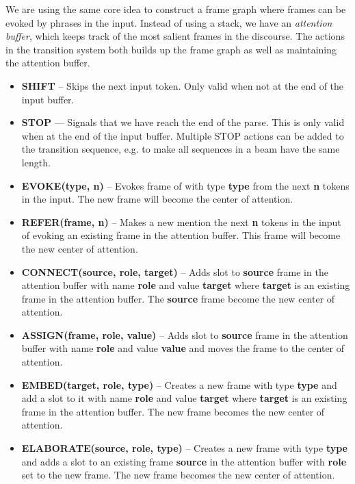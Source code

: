 \documentclass[11pt,a4paper]{article}
\begin{document}
We are using the same core idea to construct a frame graph where frames can be
evoked by phrases in the input. Instead of using a stack, we have an
\emph{attention buffer}, which keeps track of the most salient frames in the
discourse. The actions in the transition system both builds up the frame graph
as well as maintaining the attention buffer.

\begin{itemize}
  \item {\bf SHIFT} -- Skips the next input token. Only valid when not at the
        end of the input buffer.

  \item {\bf STOP} --- Signals that we have reach the end of the parse. This is
        only valid when at the end of the input buffer. Multiple STOP actions
        can be added to the transition sequence, e.g. to make all sequences in a
        beam have the same length.

  \item {\bf EVOKE(type, n)} -- Evokes frame of with type {\bf type} from
        the next {\bf n} tokens in the input. The new frame will become the
        center of attention.

  \item {\bf REFER(frame, n)} -- Makes a new mention the next {\bf n} tokens in
        the input of evoking an existing frame in the attention buffer. This
        frame will become the new center of attention.

  \item {\bf CONNECT(source, role, target)} -- Adds slot to {\bf source} frame
        in the attention buffer with name {\bf role} and value {\bf target}
        where {\bf target} is an existing frame in the attention buffer. The
        {\bf source} frame become the new center of attention.

  \item {\bf ASSIGN(frame, role, value)} -- Adds slot to {\bf source} frame in
        the attention buffer  with name {\bf role} and value {\bf value} and
        moves the frame to the center of attention.

  \item {\bf EMBED(target, role, type)} -- Creates a new frame with
        type {\bf type} and add a slot to it with name {\bf role} and value
        {\bf target} where {\bf target} is an existing frame in the attention
        buffer. The new frame becomes the new center of attention.

  \item {\bf ELABORATE(source, role, type)} -- Creates a new frame with type
        {\bf type} and adds a slot to an existing frame {\bf source} in the
        attention buffer with {\bf role} set to the new frame. The new frame
        becomes the new center of attention.
\end{itemize}
\end{document}
